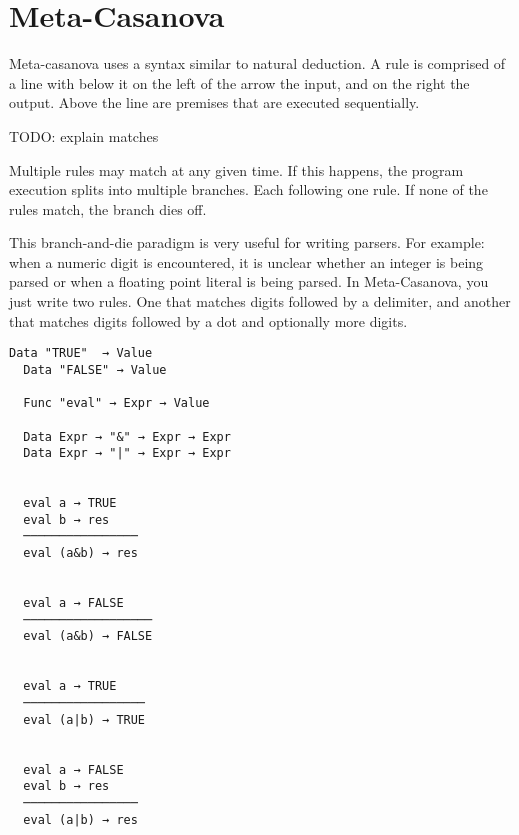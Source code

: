 \section{Meta-Casanova}
\begin{multicols}{2}
  Meta-casanova uses a syntax similar to natural deduction.
  A rule is comprised of a line with below it on the left of the arrow the input, and on the right the output.
  Above the line are premises that are executed sequentially.

  TODO: explain matches

  Multiple rules may match at any given time.
  If this happens, the program execution splits into multiple branches.
  Each following one rule.
  If none of the rules match, the branch dies off. 
  
  This branch-and-die paradigm is very useful for writing parsers.
  For example: when a numeric digit is encountered, it is unclear whether an integer is being parsed or when a floating point literal is being parsed. 
  In Meta-Casanova, you just write two rules. One that matches digits followed by a delimiter, and another that matches digits followed by a dot and optionally more digits.
\begin{lstlisting}[caption=A Boolean expression interpreter in Meta-Casanova.]
  Data "TRUE"  → Value
  Data "FALSE" → Value

  Func "eval" → Expr → Value

  Data Expr → "&" → Expr → Expr
  Data Expr → "|" → Expr → Expr


  eval a → TRUE
  eval b → res
  ────────────────
  eval (a&b) → res
  

  eval a → FALSE
  ──────────────────
  eval (a&b) → FALSE
 

  eval a → TRUE
  ─────────────────
  eval (a|b) → TRUE


  eval a → FALSE
  eval b → res
  ────────────────
  eval (a|b) → res
\end{lstlisting}

\end{multicols}
